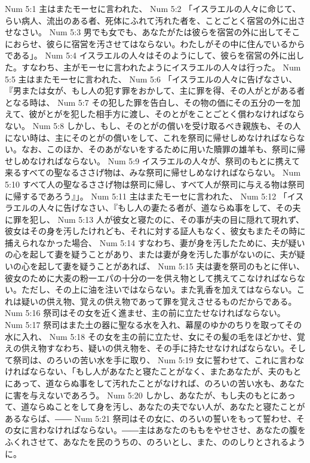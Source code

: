 Num 5:1  主はまたモーセに言われた、
Num 5:2  「イスラエルの人々に命じて、らい病人、流出のある者、死体にふれて汚れた者を、ことごとく宿営の外に出させなさい。
Num 5:3  男でも女でも、あなたがたは彼らを宿営の外に出してそこにおらせ、彼らに宿営を汚させてはならない。わたしがその中に住んでいるからである」。
Num 5:4  イスラエルの人々はそのようにして、彼らを宿営の外に出した。すなわち、主がモーセに言われたようにイスラエルの人々は行った。
Num 5:5  主はまたモーセに言われた、
Num 5:6  「イスラエルの人々に告げなさい、『男または女が、もし人の犯す罪をおかして、主に罪を得、その人がとがある者となる時は、
Num 5:7  その犯した罪を告白し、その物の価にその五分の一を加えて、彼がとがを犯した相手方に渡し、そのとがをことごとく償わなければならない。
Num 5:8  しかし、もし、そのとがの償いを受け取るべき親族も、その人にない時は、主にそのとがの償いをして、これを祭司に帰せしめなければならない。なお、このほか、そのあがないをするために用いた贖罪の雄羊も、祭司に帰せしめなければならない。
Num 5:9  イスラエルの人々が、祭司のもとに携えて来るすべての聖なるささげ物は、みな祭司に帰せしめなければならない。
Num 5:10  すべて人の聖なるささげ物は祭司に帰し、すべて人が祭司に与える物は祭司に帰するであろう』」。
Num 5:11  主はまたモーセに言われた、
Num 5:12  「イスラエルの人々に告げなさい、『もし人の妻たる者が、道ならぬ事をして、その夫に罪を犯し、
Num 5:13  人が彼女と寝たのに、その事が夫の目に隠れて現れず、彼女はその身を汚したけれども、それに対する証人もなく、彼女もまたその時に捕えられなかった場合、
Num 5:14  すなわち、妻が身を汚したために、夫が疑いの心を起して妻を疑うことがあり、または妻が身を汚した事がないのに、夫が疑いの心を起して妻を疑うことがあれば、
Num 5:15  夫は妻を祭司のもとに伴い、彼女のために大麦の粉一エパの十分の一を供え物として携えてこなければならない。ただし、その上に油を注いではならない。また乳香を加えてはならない。これは疑いの供え物、覚えの供え物であって罪を覚えさせるものだからである。
Num 5:16  祭司はその女を近く進ませ、主の前に立たせなければならない。
Num 5:17  祭司はまた土の器に聖なる水を入れ、幕屋のゆかのちりを取ってその水に入れ、
Num 5:18  その女を主の前に立たせ、女にその髪の毛をほどかせ、覚えの供え物すなわち、疑いの供え物を、その手に持たせなければならない。そして祭司は、のろいの苦い水を手に取り、
Num 5:19  女に誓わせて、これに言わなければならない、「もし人があなたと寝たことがなく、またあなたが、夫のもとにあって、道ならぬ事をして汚れたことがなければ、のろいの苦い水も、あなたに害を与えないであろう。
Num 5:20  しかし、あなたが、もし夫のもとにあって、道ならぬことをして身を汚し、あなたの夫でない人が、あなたと寝たことがあるならば、――
Num 5:21  祭司はその女に、のろいの誓いをもって誓わせ、その女に言わなければならない。――主はあなたのももをやせさせ、あなたの腹をふくれさせて、あなたを民のうちの、のろいとし、また、ののしりとされるように。

